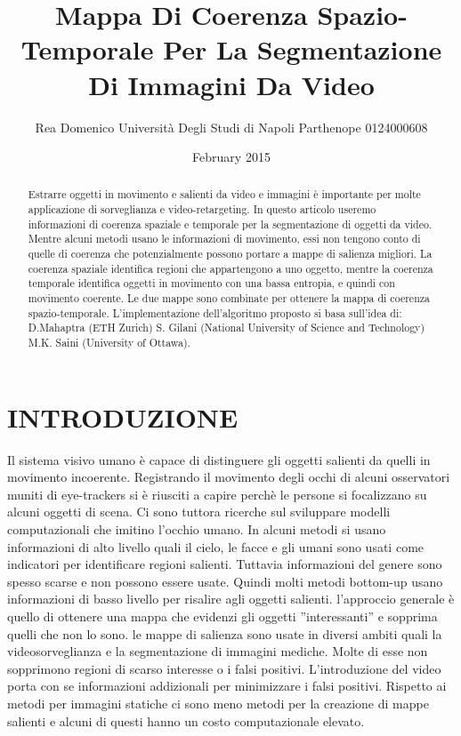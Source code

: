 \documentclass[12pt,oneside]{IEEEtran}
\begin{document}
	\title{Mappa Di Coerenza Spazio-Temporale Per La Segmentazione Di Immagini Da Video}
	\author{Rea Domenico Università Degli Studi di Napoli Parthenope 0124000608}
	\date{February 2015}
	\maketitle
	\begin{abstract}
	Estrarre oggetti in movimento e salienti da video e immagini è importante per molte applicazione di sorveglianza e video-retargeting. In questo articolo useremo informazioni di coerenza spaziale e temporale per la segmentazione di oggetti da video. Mentre alcuni metodi usano le informazioni di movimento, essi non tengono conto di quelle di coerenza che potenzialmente possono portare a mappe di salienza migliori. La coerenza spaziale identifica regioni che appartengono a uno oggetto, mentre la coerenza temporale identifica oggetti in movimento con una bassa entropia, e quindi con movimento coerente. Le due mappe sono combinate per ottenere la mappa di coerenza spazio-temporale.
	L'implementazione dell'algoritmo proposto si basa sull'idea di:\newline
	D.Mahaptra (ETH Zurich)\newline
	S. Gilani (National University of Science and Technology)\newline
	M.K. Saini (University of Ottawa).
	\end{abstract}
	\section{INTRODUZIONE}
		Il sistema visivo umano è capace di distinguere gli oggetti salienti da quelli in movimento incoerente. Registrando il movimento degli occhi di alcuni osservatori muniti di eye-trackers si è riusciti a capire perchè le persone si focalizzano su alcuni oggetti di scena. Ci sono tuttora ricerche sul sviluppare modelli computazionali che imitino l'occhio umano. In alcuni metodi si usano informazioni di alto livello quali il cielo, le facce e gli umani sono usati come indicatori per identificare regioni salienti. Tuttavia informazioni del genere sono spesso scarse e non possono essere usate. Quindi molti metodi bottom-up usano informazioni di basso livello per risalire agli oggetti salienti. l'approccio generale è quello di ottenere una mappa che evidenzi gli oggetti ''interessanti'' e sopprima quelli che non lo sono. le mappe di salienza sono usate in diversi ambiti quali la videosorveglianza e la segmentazione di immagini mediche. Molte di esse non sopprimono regioni di scarso interesse o i falsi positivi.\newline
		L'introduzione del video porta con se informazioni addizionali per minimizzare i falsi positivi.
		Rispetto ai metodi per immagini statiche ci sono meno metodi per la creazione di mappe salienti e alcuni di questi hanno un costo computazionale elevato.
\end{document}
